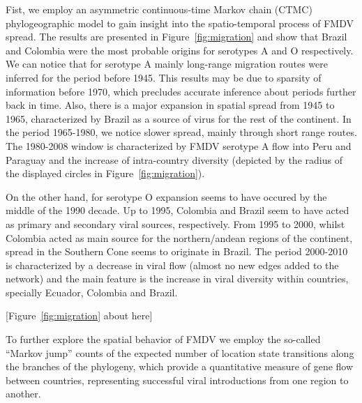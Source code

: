 \documentclass[10pt]{article}
\begin{document}
Fist, we employ an asymmetric continuous-time Markov chain (CTMC) phylogeographic model \cite{roots} to gain insight into the spatio-temporal process of FMDV spread.
The results are presented in Figure~\ref{fig:migration} and show that Brazil and Colombia were the most probable origins for serotypes A and O respectively.
We can notice that for serotype A mainly long-range migration routes were inferred for the period before 1945.
This results may be due to sparsity of information before 1970, which precludes accurate inference about periods further back in time. 
Also, there is a major expansion in spatial spread from 1945 to 1965, characterized by Brazil as a source of virus for the rest of the continent.
In the period 1965-1980, we notice slower spread, mainly through short range routes.
The 1980-2008 window is characterized by FMDV serotype A flow into Peru and Paraguay and the increase of intra-country diversity (depicted by the radius of the displayed circles in Figure~\ref{fig:migration}). %

On the other hand, for serotype O expansion seems to have occured by the middle of the 1990 decade.
Up to 1995, Colombia and Brazil seem to have acted as primary and secondary viral sources, respectively.
From 1995 to 2000, whilst Colombia acted as main source for the northern/andean regions of the continent, spread in the Southern Cone seems to originate in Brazil.
The period 2000-2010 is characterized by a decrease in viral flow (almost no new edges added to the network) and the main feature is the increase in viral diversity within countries, specially Ecuador, Colombia and Brazil.

\begin{center}
 [Figure~\ref{fig:migration} about here]
\end{center}

To further explore the spatial behavior of FMDV we employ the so-called ``Markov jump'' counts \cite{Minin2008} of the expected number of location state transitions along the  branches of the phylogeny, which  provide a quantitative measure of gene flow between countries, representing successful viral introductions from one region to another.
\end{document}
